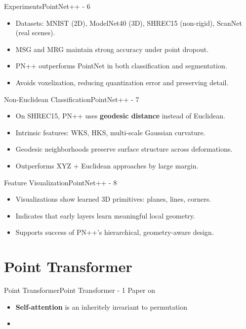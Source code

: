 \documentclass{beamer}
\begin{document}
		\begin{frame}{Experiments}{PointNet++ - 6}
			\begin{itemize}
				\item Datasets: MNIST (2D), ModelNet40 (3D), SHREC15 (non-rigid), ScanNet (real scenes).
				\item MSG and MRG maintain strong accuracy under point dropout.
				\item PN++ outperforms PointNet in both classification and segmentation.
				\item Avoids voxelization, reducing quantization error and preserving detail.
			\end{itemize}
		\end{frame}

		\begin{frame}{Non-Euclidean Classification}{PointNet++ - 7}
			\begin{itemize}
				\item On SHREC15, PN++ uses \textbf{geodesic distance} instead of Euclidean.
				\item Intrinsic features: WKS, HKS, multi-scale Gaussian curvature.
				\item Geodesic neighborhoods preserve surface structure across deformations.
				\item Outperforms XYZ + Euclidean approaches by large margin.
			\end{itemize}
		\end{frame}

		\begin{frame}{Feature Visualization}{PointNet++ - 8}
			\begin{itemize}
				\item Visualizations show learned 3D primitives: planes, lines, corners.
				\item Indicates that early layers learn meaningful local geometry.
				\item Supports success of PN++'s hierarchical, geometry-aware design.
			\end{itemize}
		\end{frame}
	
	\section{Point Transformer}
		\begin{frame}{Point Transformer}{Point Transformer - 1}
			Paper on
			\begin{itemize}
				\item \textbf{Self-attention} is an inheritely invariant to permutation
				\item 
			\end{itemize}
		\end{frame}
\end{document}
